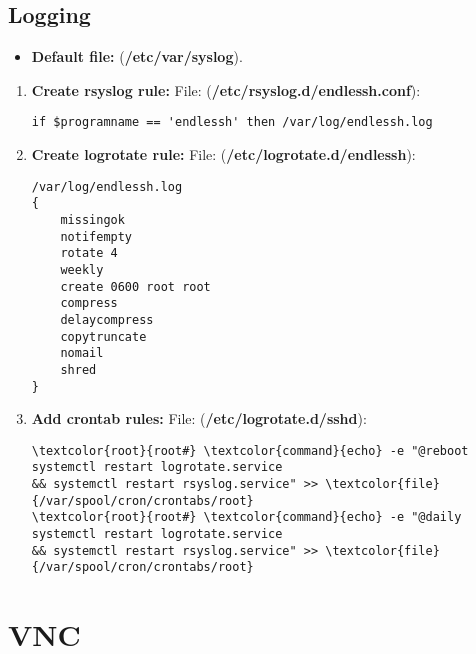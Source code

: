 \documentclass[10pt, a4paper, onecolumn, openany]{book} %
\begin{document}
\section{Logging}
\begin{itemize}
    \item \textbf{Default file:} (\textbf{\textcolor{file}{/etc/var/syslog}}).
\end{itemize}
\begin{enumerate}
    \item \textbf{Create rsyslog rule:}
\newline File: (\textbf{\textcolor{file}{/etc/rsyslog.d/endlessh.conf}}):
\begin{verbatim}
if $programname == 'endlessh' then /var/log/endlessh.log
\end{verbatim}
    \item \textbf{Create logrotate rule:}
\newline File: (\textbf{\textcolor{file}{/etc/logrotate.d/endlessh}}):
\begin{verbatim}
/var/log/endlessh.log
{
    missingok
    notifempty
    rotate 4
    weekly
    create 0600 root root
    compress
    delaycompress
    copytruncate
    nomail
    shred
}
\end{verbatim}
    \item \textbf{Add crontab rules:}
\newline File: (\textbf{\textcolor{file}{/etc/logrotate.d/sshd}}):
\begin{Verbatim}[commandchars=\\\{\}]
\textcolor{root}{root#} \textcolor{command}{echo} -e "@reboot systemctl restart logrotate.service 
&& systemctl restart rsyslog.service" >> \textcolor{file}{/var/spool/cron/crontabs/root}
\textcolor{root}{root#} \textcolor{command}{echo} -e "@daily systemctl restart logrotate.service 
&& systemctl restart rsyslog.service" >> \textcolor{file}{/var/spool/cron/crontabs/root}
\end{Verbatim}
\end{enumerate}
\chapter{VNC}
\end{document}
